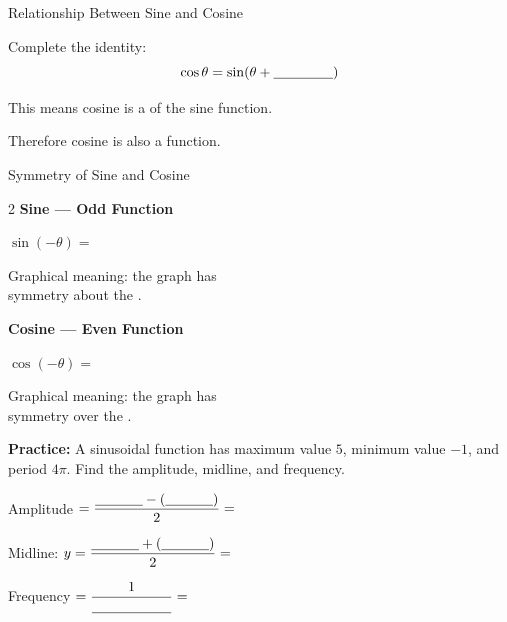 \documentclass[10pt]{article}
\begin{document}
\vspace{0.08in}

\begin{notesbox}{Relationship Between Sine and Cosine}

Complete the identity:
\[
  \cos\theta = \sin\!\left(\theta + \underline{\hspace{1.5cm}}\right)
\]

This means cosine is a \underline{\hspace{4cm}} of the sine function.

Therefore cosine is also a \underline{\hspace{4cm}} function.

\end{notesbox}

\vspace{0.08in}

\begin{notesbox}{Symmetry of Sine and Cosine}

\begin{multicols}{2}
\textbf{Sine --- Odd Function}

$\sin(-\theta) = $ \blank{2.5cm}

Graphical meaning: the graph has
\underline{\hspace{3.5cm}}\\
symmetry about the \underline{\hspace{2cm}}.

\columnbreak

\textbf{Cosine --- Even Function}

$\cos(-\theta) = $ \blank{2.5cm}

Graphical meaning: the graph has
\underline{\hspace{3.5cm}}\\
symmetry over the \underline{\hspace{2cm}}.
\end{multicols}

\end{notesbox}

\vspace{0.08in}

\begin{practicebox}
\textbf{Practice:} A sinusoidal function has maximum value $5$, minimum value $-1$,
and period $4\pi$.  Find the amplitude, midline, and frequency.

\medskip
Amplitude $= \dfrac{\blank{1.2cm} - (\blank{1.2cm})}{2} = $ \blank{1.5cm}

\medskip
Midline: $y = \dfrac{\blank{1.2cm} + (\blank{1.2cm})}{2} = $ \blank{1.5cm}

\medskip
Frequency $= \dfrac{1}{\blank{2cm}} = $ \blank{2.5cm}
\end{practicebox}
\end{document}
